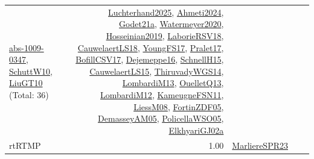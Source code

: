 {\begin{longtable}{p{3cm}r>{\raggedright\arraybackslash}p{6cm}>{\raggedright\arraybackslash}p{6cm}>{\raggedright\arraybackslash}p{8cm}}
\hyperref[detail:abs-1009-0347]{abs-1009-0347}, \hyperref[detail:SchuttW10]{SchuttW10}, \hyperref[detail:LiuGT10]{LiuGT10} (Total: 36) & \hyperref[detail:Luchterhand2025]{Luchterhand2025}, \hyperref[detail:Ahmeti2024]{Ahmeti2024}, \hyperref[detail:Godet21a]{Godet21a}, \hyperref[detail:Watermeyer2020]{Watermeyer2020}, \hyperref[detail:Hosseinian2019]{Hosseinian2019}, \hyperref[detail:LaborieRSV18]{LaborieRSV18}, \hyperref[detail:CauwelaertLS18]{CauwelaertLS18}, \hyperref[detail:YoungFS17]{YoungFS17}, \hyperref[detail:Pralet17]{Pralet17}, \hyperref[detail:BofillCSV17]{BofillCSV17}, \hyperref[detail:Dejemeppe16]{Dejemeppe16}, \hyperref[detail:SchnellH15]{SchnellH15}, \hyperref[detail:CauwelaertLS15]{CauwelaertLS15}, \hyperref[detail:ThiruvadyWGS14]{ThiruvadyWGS14}, \hyperref[detail:LombardiM13]{LombardiM13}, \hyperref[detail:OuelletQ13]{OuelletQ13}, \hyperref[detail:LombardiM12]{LombardiM12}, \hyperref[detail:KameugneFSN11]{KameugneFSN11}, \hyperref[detail:LiessM08]{LiessM08}, \hyperref[detail:FortinZDF05]{FortinZDF05}, \hyperref[detail:DemasseyAM05]{DemasseyAM05}, \hyperref[detail:PolicellaWSO05]{PolicellaWSO05}, \hyperref[detail:ElkhyariGJ02a]{ElkhyariGJ02a}\\
\index{rtRTMP}\index{Classification!rtRTMP}rtRTMP &  1.00 & \hyperref[detail:MarliereSPR23]{MarliereSPR23} &  & \\

\end{longtable}}
